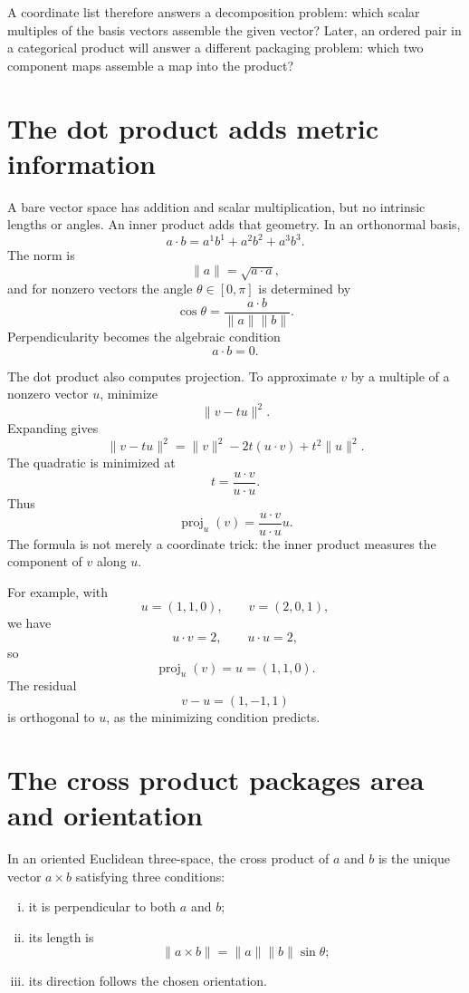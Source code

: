A coordinate list therefore answers a decomposition problem: which scalar multiples of the basis vectors assemble the given vector?  Later, an ordered pair in a categorical product will answer a different packaging problem: which two component maps assemble a map into the product?

\section{The dot product adds metric information}

A bare vector space has addition and scalar multiplication, but no intrinsic lengths or angles.  An inner product adds that geometry.  In an orthonormal basis,
\[
  a\cdot b=a^1b^1+a^2b^2+a^3b^3.
\]
The norm is
\[
  \|a\|=\sqrt{a\cdot a},
\]
and for nonzero vectors the angle \(\theta\in[0,\pi]\) is determined by
\[
  \cos\theta=\frac{a\cdot b}{\|a\|\|b\|}.
\]
Perpendicularity becomes the algebraic condition
\[
  a\cdot b=0.
\]

The dot product also computes projection.  To approximate \(v\) by a multiple of a nonzero vector \(u\), minimize
\[
  \|v-tu\|^2.
\]
Expanding gives
\[
  \|v-tu\|^2
  =\|v\|^2-2t(u\cdot v)+t^2\|u\|^2.
\]
The quadratic is minimized at
\[
  t=\frac{u\cdot v}{u\cdot u}.
\]
Thus
\[
  \operatorname{proj}_u(v)
  =\frac{u\cdot v}{u\cdot u}u.
\]
The formula is not merely a coordinate trick: the inner product measures the component of \(v\) along \(u\).

For example, with
\[
  u=(1,1,0),
  \qquad
  v=(2,0,1),
\]
we have
\[
  u\cdot v=2,
  \qquad
  u\cdot u=2,
\]
so
\[
  \operatorname{proj}_u(v)=u=(1,1,0).
\]
The residual
\[
  v-u=(1,-1,1)
\]
is orthogonal to \(u\), as the minimizing condition predicts.

\section{The cross product packages area and orientation}

In an oriented Euclidean three-space, the cross product of \(a\) and \(b\) is the unique vector \(a\times b\) satisfying three conditions:

\begin{enumerate}[(i)]
  \item it is perpendicular to both \(a\) and \(b\);
  \item its length is
  \[
    \|a\times b\|=\|a\|\|b\|\sin\theta;
  \]
  \item its direction follows the chosen orientation.
\end{enumerate}

